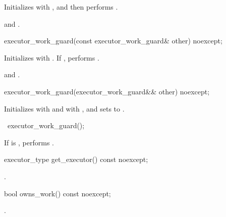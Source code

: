 \begin{itemdescr}
\pnum
\effects Initializes  with , and then performs .

\pnum
\postconditions {} and .
\end{itemdescr}

\begin{itemdecl}
executor_work_guard(const executor_work_guard& other) noexcept;
\end{itemdecl}

\begin{itemdescr}
\pnum
\effects Initializes  with . If , performs .

\pnum
\postconditions {} and .
\end{itemdescr}

\begin{itemdecl}
executor_work_guard(executor_work_guard&& other) noexcept;
\end{itemdecl}

\begin{itemdescr}
\pnum
\effects Initializes  with  and  with , and sets  to .
\end{itemdescr}

\begin{itemdecl}
~executor_work_guard();
\end{itemdecl}

\begin{itemdescr}
\pnum
\effects If  is , performs .
\end{itemdescr}

\begin{itemdecl}
executor_type get_executor() const noexcept;
\end{itemdecl}

\begin{itemdescr}
\pnum
\returns {}.
\end{itemdescr}

\begin{itemdecl}
bool owns_work() const noexcept;
\end{itemdecl}

\begin{itemdescr}
\pnum
\returns {}.
\end{itemdescr}

